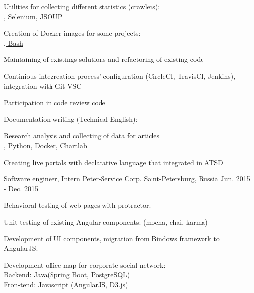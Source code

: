 \begin{cventries}
{\begin{cvitems}
{        }
        \item { Utilities for collecting different statistics (crawlers):
         \\ \href{https://github.com/axibase/atsd-data-crawlers/tree/energinet-grabber}{\faGithubSquare\acvHeaderIconSep\@Java, Selenium, JSOUP}
        }
        \item { Creation of Docker images for some projects:
         \\ \href{https://github.com/axibase/atsd-data-crawlers/tree/energinet-grabber-docker}{\faGithubSquare\acvHeaderIconSep\@Docker, Bash}
        }
        \item{Maintaining of existings solutions and refactoring of existing code}
        \item{Continious integreation process' configuration (CircleCI, TravisCI, Jenkins), integration with Git VSC}
        \item{Participation in code review code}
        \item{Documentation writing (Technical English):
          \\ \href{https://github.com/axibase/atsd}{\faGithubSquare\acvHeaderIconSep\@Markdown}
        }
        \item{Research analysis and collecting of data for articles
          \\ \href{https://github.com/axibase/atsd-use-cases}{\faGithubSquare\acvHeaderIconSep\@Bash, Python, Docker, Chartlab}
        }
        \item{Creating live portals with declarative language that integrated in ATSD}
      \end{cvitems}
    }
    \cventry
      {Software engineer, Intern} %
      {Peter-Service Corp.} %
      {Saint-Petersburg, Russia} %
      {Jun. 2015 - Dec. 2015} %
      {
        \begin{cvitems} %
          \item {Behavioral testing of web pages with protractor.}
          \item {Unit testing of existing Angular components: (mocha, chai, karma)}
          \item {Development of UI components, migration from Bindows framework to AngularJS.}
          \item{ Development office map for corporate social network:
            \\ Backend: Java(Spring Boot, PostgreSQL)
            \\ Fron-tend: Javascript (AngularJS, D3.js)
          }
        \end{cvitems}
    }
\end{cventries}
